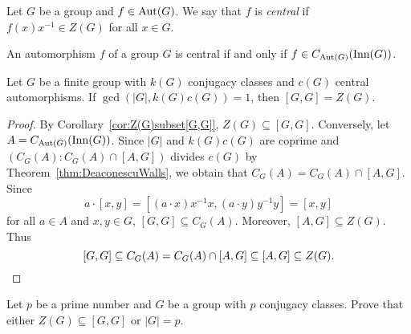 \begin{definition}
 	Let $G$ be a group and $f\in\operatorname{Aut}(G)$. We say that $f$ is \emph{central} if 
	$f(x)x^{-1}\in Z(G)$ for all $x\in G$.
\end{definition}

An automorphism $f$ of a group $G$ 
is central if and only if $f\in C_{\operatorname{Aut}(G)}(\operatorname{Inn}(G))$.

\begin{corollary}
	Let $G$ be a finite group with $k(G)$ conjugacy classes and $c(G)$
	central automorphisms. If $\gcd(|G|,k(G)c(G))=1$, then 
	$[G,G]=Z(G)$.
\end{corollary}

\begin{proof}
	By Corollary~\ref{cor:Z(G)subset[G,G]}, $Z(G)\subseteq [G,G]$. Conversely, let 
	$A=C_{\operatorname{Aut}(G)}(\operatorname{Inn}(G))$. Since $|G|$ and $k(G)c(G)$ are coprime 
	and $(C_G(A):C_G(A)\cap [A,G])$ divides $c(G)$ by 
	Theorem~\ref{thm:DeaconescuWalls}, we obtain that $C_G(A)=C_G(A)\cap [A,G]$. 
	Since 
	\[
		a\cdot [x,y]=[(a\cdot x)x^{-1}x,(a\cdot y)y^{-1}y]=[x,y]
	\]
	for all $a\in A$ and $x,y\in G$, 
    $[G,G]\subseteq C_G(A)$. Moreover, 
    $[A,G]\subseteq Z(G)$. Thus 
	\[
	[G,G]\subseteq C_G(A)=C_G(A)\cap [A,G]\subseteq [A,G]\subseteq Z(G).\qedhere 
	\]
\end{proof}

\begin{exercise}
    Let $p$ be a prime number and $G$ be a group with $p$ conjugacy classes. 
    Prove that either $Z(G)\subseteq[G,G]$ or $|G|=p$. 
\end{exercise}



